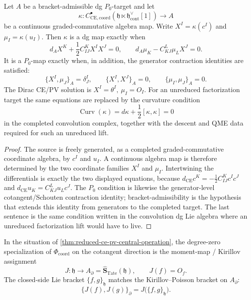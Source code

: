 \documentclass[11pt]{memoir}
\begin{document}
\begin{prop}\label{prop:coordinate-coupling-equations}
  Let \(A\) be a bracket-admissible dg \(P_0\)-target and let
  \[
    \kappa\colon
    C^\bullet_{\mathrm{CE},\mathrm{coord}}
    (\mathfrak h\ltimes\mathfrak h^\vee_{\mathrm{cont}}[1])
    \longrightarrow A
  \]
  be a continuous graded-commutative algebra map.  Write
  \(X^I=\kappa(c^I)\) and \(\mu_I=\kappa(u_I)\).  Then \(\kappa\) is a dg
  map exactly when
  \[
    d_A X^K+\frac12 C^K_{IJ}X^IX^J=0,\qquad
    d_A\mu_K-C^L_{KJ}\mu_LX^J=0 .
  \]
  It is a \(P_0\)-map exactly when, in addition, the generator
  contraction identities are satisfied:
  \[
    \{X^I,\mu_J\}_A=\delta^I_J,\qquad
    \{X^I,X^J\}_A=0,\qquad
    \{\mu_I,\mu_J\}_A=0 .
  \]
  The Dirac CE/PV solution is
  \(X^I=\theta^I,\ \mu_I=O_I\).  For an unreduced factorization target the
  same equations are replaced by the curvature condition
  \[
    \operatorname{Curv}(\kappa)
    =d\kappa+\frac12[\kappa,\kappa]=0
  \]
  in the completed convolution complex, together with the descent and
  QME data required for such an unreduced lift.
\end{prop}

\begin{proof}
  The source is freely generated, as a completed graded-commutative
  coordinate algebra, by \(c^I\) and \(u_I\).  A continuous algebra map is
  therefore determined by the two coordinate families \(X^I\) and
  \(\mu_I\).  Intertwining the differentials is exactly the two displayed
  equations, because
  \(d_{\mathrm{CE}}c^K=-\frac12C^K_{IJ}c^Ic^J\) and
  \(d_{\mathrm{CE}}u_K=C^L_{KJ}u_Lc^J\).  The \(P_0\) condition is
  likewise the generator-level cotangent/Schouten contraction identity;
  bracket-admissibility is the hypothesis that extends this identity from
  generators to the completed target.  The last sentence is the same
  condition written in the convolution dg Lie algebra where an unreduced
  factorization lift would have to live.
\end{proof}



\begin{cor}\label{cor:moment-map-shadow}
  In the situation of \ref{thm:reduced-ce-pv-central-operation}, the
  degree-zero specialization of \(\Phi_{\mathrm{coord}}\) on the
  cotangent direction is
  the moment-map / Kirillov assignment
  $$J:\mathfrak h\longrightarrow A_\partial=
    \widehat{\mathbf S}_{\mathrm{Tate}}(\mathfrak h),
    \qquad J(f)=O_f.$$
  The closed-side Lie bracket $\{f,g\}_{\mathfrak h}$ matches the
  Kirillov--Poisson bracket on $A_\partial$:
  $$\{J(f),J(g)\}_\partial=J\bigl(\{f,g\}_{\mathfrak h}\bigr).$$
\end{cor}
\end{document}
